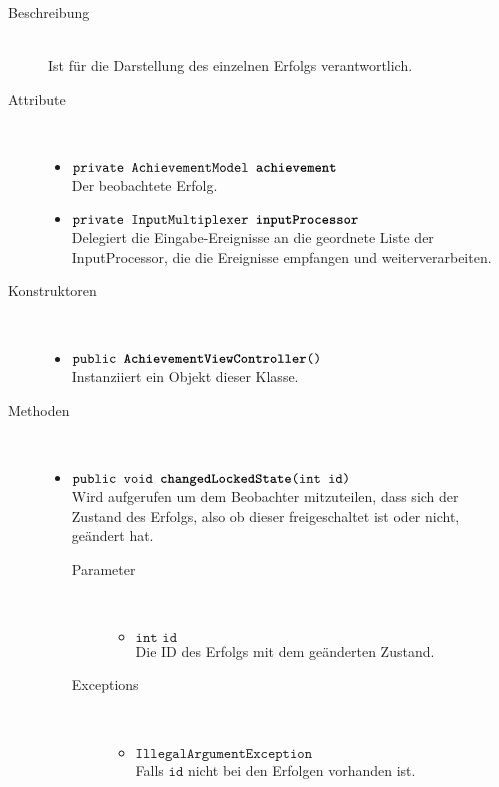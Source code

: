 \begin{description}
\item[Beschreibung] \hfill \\ Ist für die Darstellung des einzelnen Erfolgs verantwortlich.
\item[Attribute] \hfill \\
	\vspace{-.8cm}
	\begin{itemize}
		\item $\texttt{private AchievementModel \textbf{achievement}}$ \\ Der beobachtete Erfolg.
		\item $\texttt{private InputMultiplexer \textbf{inputProcessor}}$ \\ Delegiert die Eingabe-Ereignisse an die geordnete Liste der InputProcessor, die die Ereignisse empfangen und weiterverarbeiten.
	\end{itemize}
	
\item[Konstruktoren] \hfill \\
	\vspace{-.8cm}
	\begin{itemize}
		\item $\texttt{public \textbf{AchievementViewController}()}$ \\ Instanziiert ein Objekt dieser Klasse.
	\end{itemize}
	
\item[Methoden] \hfill \\
	\vspace{-.8cm}
	\begin{itemize}
		\item $\texttt{public void \textbf{changedLockedState}(int id)}$ \\ Wird aufgerufen um dem Beobachter mitzuteilen, dass sich der Zustand des Erfolgs, also ob dieser freigeschaltet ist oder nicht, geändert hat.
			\begin{description}
				\item[Parameter] \hfill \\
				\vspace{-.8cm}
				\begin{itemize}
					\item $\texttt{int id}$ \\ Die ID des Erfolgs mit dem geänderten Zustand.
				\end{itemize}
				\item[Exceptions] \hfill \\
				\vspace{-.8cm}
				\begin{itemize}
					\item $\texttt{IllegalArgumentException}$ \\ Falls $\texttt{id}$ nicht bei den Erfolgen vorhanden ist.
				\end{itemize}
			\end{description}	
			

\end{itemize}
\end{description}
